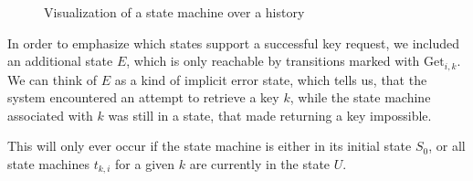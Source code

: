 \begin{figure}[h]
    \centering
    \caption{Visualization of a state machine over a history}
\end{figure}

In order to emphasize which states support a successful key request, we included an additional state \(E\), which is only reachable by transitions marked with \(\text{Get}_{i,k}\). We can think of \(E\) as a kind of implicit error state, which tells us, that the system encountered an attempt to retrieve a key \(k\), while the state machine associated with \(k\) was still in a state, that made returning a key impossible. 

This will only ever occur if the state machine is either in its initial state \(S_0\), or all state machines \(t_{k,i}\) for a given \(k\) are currently in the state \(U\).

